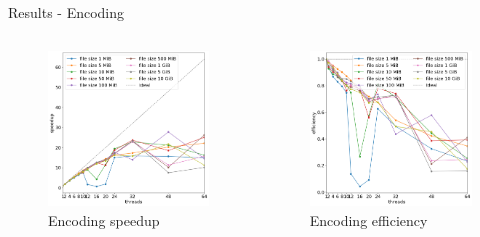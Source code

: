 \begin{frame}{Results - Encoding}
    \begin{columns}
            \begin{figure}
                \centering
                \includegraphics[width=\textwidth]{imgs/encoding speedup.png}
                \caption{Encoding speedup}
                \label{fig:encoding-speedup}
            \end{figure}
            \begin{figure}
                \centering
                \includegraphics[width=\textwidth]{imgs/encode efficiency.png}
                \caption{Encoding efficiency}
                \label{fig:encoding-efficiency}
            \end{figure}
    \end{columns}
\end{frame}
